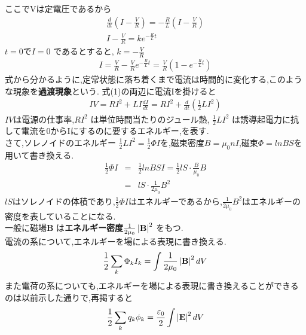 \documentclass{jsarticle}
\begin{document}
ここでVは定電圧であるから
\begin{eqnarray*}
\frac{d}{dt} \left( I - \frac{V}{R} \right) =  -\frac{R}{L} \left( I - \frac{V}{R} \right) \\
I - \frac{V}{R} = k e^{-\frac{R}{L}t}
\end{eqnarray*}
$t=0$で$I=0$ であるとすると, $k=-\frac{V}{R}$
\begin{eqnarray*}
I = \frac{V}{R} - \frac{V}{R} e^{-\frac{R}{L}t} = \frac{V}{R} \left( 1 - e^{-\frac{R}{L}t} \right)
\end{eqnarray*}
式から分かるように,定常状態に落ち着くまで電流は時間的に変化する,このような現象を{\bf 過渡現象}という.
式(1)の両辺に電流Iを掛けると
\begin{eqnarray*}
IV = RI^2 + LI \frac{dI}{dt} = RI^2 + \frac{d}{dt} \left( \frac{1}{2} LI^2 \right)
\end{eqnarray*}
$IV$は電源の仕事率,$RI^2$ は単位時間当たりのジュール熱, $\frac{1}{2} LI^2$ は誘導起電力に抗して電流を0からIにするのに要するエネルギー,を表す. \\
さて,ソレノイドのエネルギー $\frac{1}{2} LI^2=\frac{1}{2} \Phi I$を,磁束密度$B=\mu_0 n I$,磁束$\Phi = lnBS$を用いて書き換える.
\begin{eqnarray*}
\frac{1}{2} \Phi I &=& \frac{1}{2} lnBSI = \frac{1}{2} lS \cdot \frac{B}{\mu_0} B \\
&=& lS \cdot \frac{1}{2\mu_0}B^2
\end{eqnarray*}
$lS$はソレノイドの体積であり,$\frac{1}{2} \Phi I$はエネルギーであるから,$\frac{1}{2\mu_0}B^2$はエネルギーの密度を表していることになる. \\
一般に磁場{\bf B} は{\bf エネルギー密度}$\frac{1}{2\mu_0}\left| {\bf B} \right|^2$ をもつ. \\
電流の系について,エネルギーを場による表現に書き換える.
\begin{eqnarray*}
\frac{1}{2} \sum_{k} \Phi_{k} I_{k} = \int \frac{1}{2 \mu_0} \left| {\bf B} \right|^2 dV
\end{eqnarray*}
また電荷の系についても,エネルギーを場による表現に書き換えることができるのは以前示した通りで,再掲すると \\
\begin{eqnarray*}
\frac{1}{2} \sum_{k} q_k \phi_k = \frac{\varepsilon_0}{2} \int \left| {\bf E} \right|^2 dV
\end{eqnarray*}
\end{document}
